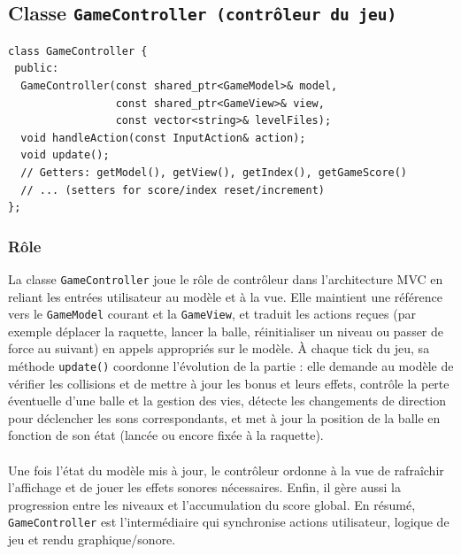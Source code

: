 \documentclass[12pt]{article}
\begin{document}


\subsection{Classe \texttt{GameController (contrôleur du jeu)}}


\begin{lstlisting}
class GameController {
 public:
  GameController(const shared_ptr<GameModel>& model,
                 const shared_ptr<GameView>& view,
                 const vector<string>& levelFiles);
  void handleAction(const InputAction& action);
  void update();
  // Getters: getModel(), getView(), getIndex(), getGameScore()
  // ... (setters for score/index reset/increment)
};

\end{lstlisting}
\newpage
\subsubsection* {Rôle}
La classe \colorbox{gray!20}{\texttt{GameController}} joue le rôle de contrôleur dans l’architecture MVC en reliant les entrées utilisateur au modèle et à la vue. Elle maintient une référence vers le \colorbox{gray!20}{\texttt{GameModel}} courant et la \colorbox{gray!20}{\texttt{GameView}}, et traduit les actions reçues (par exemple déplacer la raquette, lancer la balle, réinitialiser un niveau ou passer de force au suivant) en appels appropriés sur le modèle. À chaque tick du jeu, sa méthode \colorbox{gray!20}{\texttt{update()}} coordonne l’évolution de la partie : elle demande au modèle de vérifier les collisions et de mettre à jour les bonus et leurs effets, contrôle la perte éventuelle d’une balle et la gestion des vies, détecte les changements de direction pour déclencher les sons correspondants, et met à jour la position de la balle en fonction de son état (lancée ou encore fixée à la raquette). 

\paragraph{}
Une fois l’état du modèle mis à jour, le contrôleur ordonne à la vue de rafraîchir l’affichage et de jouer les effets sonores nécessaires. Enfin, il gère aussi la progression entre les niveaux et l’accumulation du score global. En résumé, \colorbox{gray!20}{\texttt{GameController}} est l’intermédiaire qui synchronise actions utilisateur, logique de jeu et rendu graphique/sonore.
\end{document}
